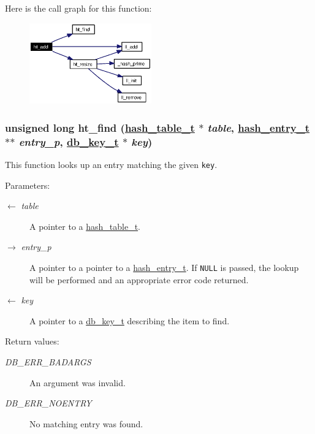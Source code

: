 Here is the call graph for this function:\begin{figure}[H]
\begin{center}
\leavevmode
\includegraphics[width=149pt]{group__dbprim__hash_ga11_cgraph}
\end{center}
\end{figure}
\hypertarget{group__dbprim__hash_ga14}{
\subsubsection[ht\_\-find]{\setlength{\rightskip}{0pt plus 5cm}unsigned long ht\_\-find (\hyperlink{struct__hash__table__s}{hash\_\-table\_\-t} $\ast$ {\em table}, \hyperlink{struct__hash__entry__s}{hash\_\-entry\_\-t} $\ast$$\ast$ {\em entry\_\-p}, \hyperlink{struct__db__key__s}{db\_\-key\_\-t} $\ast$ {\em key})}}
\label{group__dbprim__hash_ga14}


This function looks up an entry matching the given {\tt key}.

\begin{Desc}
\item[Parameters:]
\begin{description}
\item[\mbox{$\leftarrow$} {\em table}]A pointer to a \hyperlink{group__dbprim__hash_ga1}{hash\_\-table\_\-t}. \item[\mbox{$\rightarrow$} {\em entry\_\-p}]A pointer to a pointer to a \hyperlink{group__dbprim__hash_ga2}{hash\_\-entry\_\-t}. If {\tt NULL} is passed, the lookup will be performed and an appropriate error code returned. \item[\mbox{$\leftarrow$} {\em key}]A pointer to a \hyperlink{group__dbprim_ga0}{db\_\-key\_\-t} describing the item to find.\end{description}
\end{Desc}
\begin{Desc}
\item[Return values:]
\begin{description}
\item[{\em DB\_\-ERR\_\-BADARGS}]An argument was invalid. \item[{\em DB\_\-ERR\_\-NOENTRY}]No matching entry was found.\end{description}
\end{Desc}


